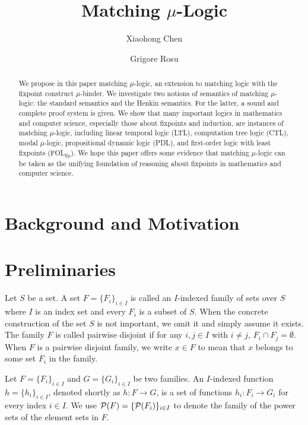 \documentclass{amsart}
\title{Matching $\mu$-Logic}
\author{Xiaohong Chen}
\author{Grigore Rosu}
\begin{document}
	
\begin{abstract}
We propose in this paper matching $\mu$-logic, 
an extension to matching logic with the fixpoint construct $\mu$-binder.
We investigate two notions of semantics of matching $\mu$-logic:
the standard semantics and the Henkin semantics. 
For the latter, a sound and complete proof system is given.
We show that many important logics in mathematics and computer science,
especially those about fixpoints and induction, are instances
of matching $\mu$-logic, including
linear temporal logic (LTL),
computation tree logic (CTL),
modal $\mu$-logic,
propositional dynamic logic (PDL),
and first-order logic with least fixpoints (FOL$_\mathrm{lfp}$).
We hope this paper offers some evidence that matching $\mu$-logic
can be taken as the unifying foundation of reasoning about fixpoints
in mathematics and computer science.
\end{abstract}

\maketitle

\tableofcontents


\section{Background and Motivation}

\section{Preliminaries}

\begin{definition}
Let $S$ be a set. 
A set $F = \{F_i\}_{i \in I}$ is called an $I$-indexed family of sets
over $S$
where $I$ is an index set and every $F_i $ is a subset of $S$.
When the concrete construction of the set $S$ is not important,
we omit it and simply assume it exists.
The family $F$ is called pairwise disjoint if
for any $i, j \in I$ with $i \neq j$, 
$F_i \cap F_j = \emptyset$.
When $F$ is a pairwise disjoint family,
we write $x \in F$ to mean that $x$ belongs to some set $F_i$ in the family. 
\end{definition}

\begin{notation}
Let $F = \{F_i\}_{i \in I}$ and $G = \{G_i\}_{i \in I}$ be two families. 
An $I$-indexed function $h = \{ h_i \}_{i \in I}$,
denoted shortly as $h \colon F \to G$,
is a set of
functions $h_i \colon F_i \to G_i$ for every index $i \in I$.
We use $\mathcal{P}(F) = \{ \mathcal{P}(F_i) \}_{i \in I}$ to denote the family of 
the power sets of the element sets in $F$.
\end{notation}
\end{document}
